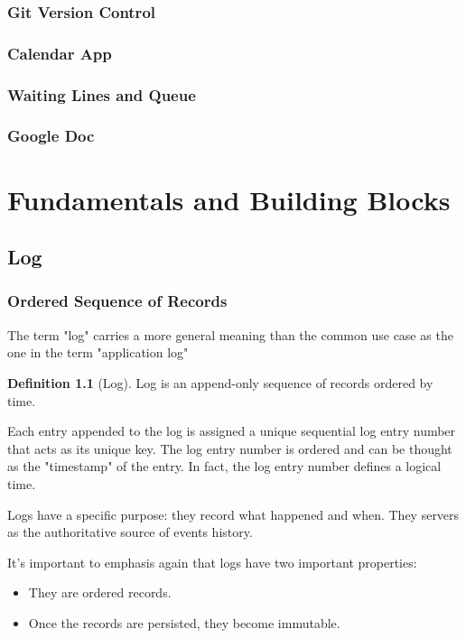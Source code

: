 \documentclass[letterpaper, oneside]{book}
\theoremstyle{definition}
\newtheorem*{definition}{Definition}
\theoremstyle{remark}
\begin{document}
\section{Git Version Control}
\section{Calendar App}
\section{Waiting Lines and Queue}
\section{Google Doc}

\part{Fundamentals and Building Blocks}


\chapter{Log}

\section{Ordered Sequence of Records}
The term "log" carries a more general meaning than the common use case as the one in the term "application log"

\begin{definition}[Log]
    Log is an append-only sequence of records ordered by time.
\end{definition}

Each entry appended to the log is assigned a unique sequential log entry number that acts as its unique key. The log entry number is ordered and can be thought as the "timestamp" of the entry. In fact, the log entry number defines a logical time.

Logs have a specific purpose: they record what happened and when. They servers as the authoritative source of events history.


It's important to emphasis again that logs have two important properties:
\begin{itemize}
    \item They are ordered records.
    \item Once the records are persisted, they become immutable.
\end{itemize}
\end{document}

